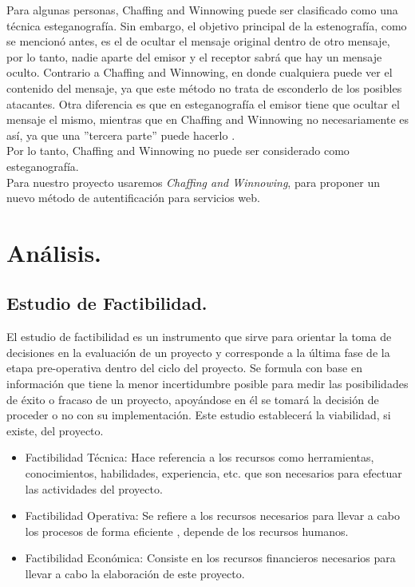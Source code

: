 \documentclass[12pt, a4paper, titlepage]{report}
\begin{document}
        Para algunas personas, Chaffing and Winnowing puede ser clasificado como una técnica esteganograf\'ia. Sin embargo, el objetivo principal de la estenografía, como se mencionó antes, es el de ocultar el mensaje original dentro de otro mensaje, por lo tanto, nadie aparte del emisor y el receptor sabrá que hay un mensaje oculto. Contrario a Chaffing and Winnowing, en donde cualquiera puede ver el contenido del mensaje, ya que este método no trata de esconderlo de los posibles atacantes. Otra diferencia es que en esteganograf\'ia el emisor tiene que ocultar el mensaje el mismo, mientras que en Chaffing and Winnowing no necesariamente es así, ya que una ''tercera parte'' puede hacerlo \cite{refChaffingVsEsteganografia}.\\
        
        Por lo tanto, Chaffing and Winnowing no puede ser considerado como esteganograf\'ia.\\
        
         Para nuestro proyecto usaremos \textit{Chaffing and Winnowing}, para proponer un nuevo método de autentificación para servicios web. \\
       
	\chapter{\textcolor{azulescom}{Análisis.}}
	    
    	\section{Estudio de Factibilidad.}
    	El estudio de factibilidad es un instrumento que sirve para orientar la toma de decisiones en la evaluación de un proyecto y corresponde a la última fase de la etapa pre-operativa dentro del ciclo del proyecto. Se formula con base en información que tiene la menor incertidumbre posible para medir las posibilidades de éxito o fracaso de un proyecto, apoyándose en él se tomará la decisión de proceder o no con su implementación. Este estudio establecerá la viabilidad, si existe, del proyecto.
    	\begin{itemize}
    	    \item Factibilidad Técnica: Hace referencia a los recursos como herramientas, conocimientos, habilidades, experiencia, etc. que son necesarios para efectuar las actividades del proyecto.
    	    \item Factibilidad Operativa: Se refiere a los recursos necesarios para llevar a cabo los procesos de forma eficiente , depende de los recursos humanos.
    	    \item Factibilidad Econ\'omica: Consiste en los recursos financieros necesarios para llevar a cabo la elaboraci\'on de este proyecto.
    	\end{itemize}
\end{document}
